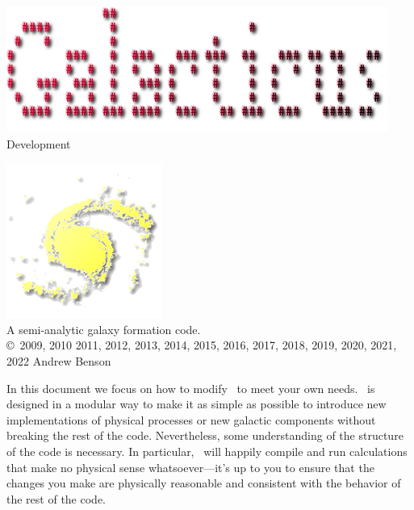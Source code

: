 \documentclass[letterpaper,10pt,headsepline]{scrbook}
\begin{document}
\lstset{language=[95]Fortran}

\frontmatter

\pagestyle{empty}
\begin{center}
\includegraphics[width=125mm]{GalacticusLogo.png}\\

\Huge Development \normalsize

\includegraphics{New_Logo_Galaxy_192_Transparent.png}\\
A semi-analytic galaxy formation code.\\

\copyright\ 2009, 2010 2011, 2012, 2013, 2014, 2015, 2016, 2017, 2018, 2019, 2020, 2021, 2022 Andrew Benson
\end{center}

\tableofcontents

\mainmatter
\pagestyle{headings}

In this document we focus on how to modify \glc\ to meet your own needs. \glc\ is designed in a modular way to make it as simple as possible to introduce new implementations of physical processes or new galactic components without breaking the rest of the code. Nevertheless, some understanding of the structure of the code is necessary. In particular, \glc\ will happily compile and run calculations that make no physical sense whatsoever---it's up to you to ensure that the changes you make are physically reasonable and consistent with the behavior of the rest of the code.







\backmatter




\printglossaries

\citeindextrue
\printindex
\end{document}
